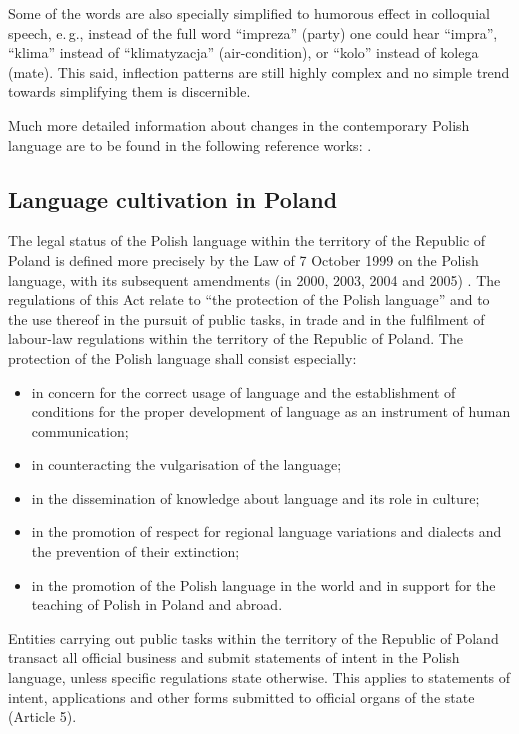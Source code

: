 \begin{multicols}{2}
Some of the words are also specially simplified to humorous effect in
colloquial speech, e.\,g., instead of the full word “impreza”
(party) one could hear “impra”, “klima” instead of
“klimatyzacja” (air-condition), or “kolo” instead of kolega
(mate). This said, inflection patterns are still highly complex and no
simple trend towards simplifying them is discernible. 

Much more detailed information about changes in the contemporary
Polish language are to be found in the following reference works:
\cite{Bralczyk1, Grzenia1, Lazinski1, Mazur1, Bralczyk2}. 

\subsection[Language cultivation in Poland]{Language cultivation in
Poland} 

The legal status of the Polish language within the territory of the
Republic of Poland is defined more precisely by the Law of 7 October
1999 on the Polish language, with its subsequent amendments (in 2000,
2003, 2004 and 2005) \cite{Efnil1}. The regulations of this Act relate
to “the protection of the Polish language” and to the use thereof
in the pursuit of public tasks, in trade and in the fulfilment of
labour-law regulations within the territory of the Republic of Poland.
The protection of the Polish language shall consist especially:
\begin{itemize} \item in concern for the correct usage of language and
the establishment of conditions for the proper development of language
as an instrument of human communication; \item in counteracting the
vulgarisation of the language; \item in the dissemination of knowledge
about language and its role in culture; \item in the promotion of
respect for regional language variations and dialects and the
prevention of their extinction; \item in the promotion of the Polish
language in the world and in support for the teaching of Polish in
Poland and abroad. \end{itemize} 

Entities carrying out public tasks within the territory of the
Republic of Poland transact all official business and submit
statements of intent in the Polish language, unless specific
regulations state otherwise. This applies to statements of intent,
applications and other forms submitted to official organs of the state
(Article 5). 


\end{multicols}
